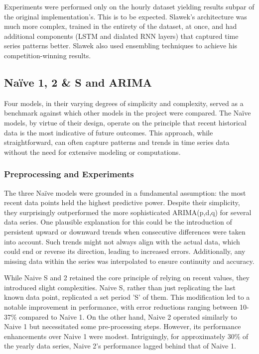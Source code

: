 \documentclass[conference]{IEEEtran}
\begin{document}
Experiments were performed only on the hourly dataset yielding results subpar of the original implementation's. This is to be expected. Slawek's\cite{esrnn} architecture was much more complex, trained in the entirety of the dataset, at once, and had additional components (LSTM and dialated RNN layers) that captured time series patterns better. Slawek also used ensembling techniques to achieve his competition-winning results.

\subsection{Naïve 1, 2 \& S and ARIMA}

Four models, in their varying degrees of simplicity and complexity, served as a benchmark against which other models in the project were compared. The Naïve models, by virtue of their design, operate on the principle that recent historical data is the most indicative of future outcomes\cite{statistical}. This approach, while straightforward, can often capture patterns and trends in time series data without the need for extensive modeling or computations. 

\subsubsection{Preprocessing and Experiments}

The three Naïve models were grounded in a fundamental assumption: the most recent data points held the highest predictive power\cite{statistical}. Despite their simplicity, they surprisingly outperformed the more sophisticated ARIMA(p,d,q) for several data series. One plausible explanation for this could be the introduction of persistent upward or downward trends when consecutive differences were taken into account. Such trends might not always align with the actual data, which could end or reverse its direction, leading to increased errors. Additionally, any missing data within the series was interpolated to ensure continuity and accuracy.

While Naive S and 2 retained the core principle of relying on recent values, they introduced slight complexities. Naive S, rather than just replicating the last known data point, replicated a set period 'S' of them. This modification led to a notable improvement in performance, with error reductions ranging between 10-37\% compared to Naive 1. On the other hand, Naive 2 operated similarly to Naive 1 but necessitated some pre-processing steps. However, its performance enhancements over Naive 1 were modest. Intriguingly, for approximately 30\% of the yearly data series, Naive 2's performance lagged behind that of Naive 1.
\end{document}
